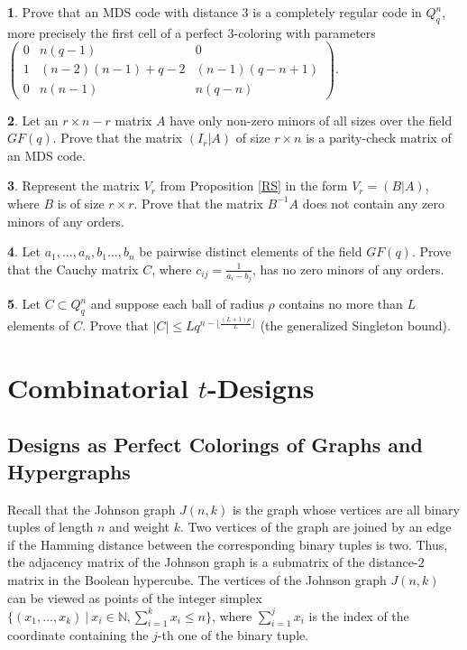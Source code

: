 \documentclass[11pt]{article}
\theoremstyle{definition}
\newtheorem{exercise}{\quad}
\begin{document}
{{{\begin{exercise}
Prove that an MDS code with distance $3$ is a completely
regular code in $Q^n_q$, more precisely the first cell of a perfect
$3$-coloring with parameters $\begin{pmatrix}
0 & n(q-1) & 0 \\
1 & (n-2)(n-1)+q-2 & (n-1)(q-n+1) \\
0 & n(n-1) & n(q-n)
\end{pmatrix}$.
\end{exercise}


\begin{exercise}
Let an $r\times n-r$ matrix $A$ have only non-zero
minors of all sizes over the field $GF(q)$. Prove that the matrix
$(I_r|A)$ of size $r\times n$ is a parity-check matrix of an
MDS code.
\end{exercise}

\begin{exercise}
Represent the matrix $V_r$ from Proposition \ref{RS} in the form $V_r=(B|A)$,
where $B$ is of size $r\times r$. Prove that the matrix $B^{-1}A$ does not
contain any zero minors of any orders.
\end{exercise}

\begin{exercise}
Let $a_1,\dots,a_n,b_1\dots,b_n$ be pairwise distinct elements of the field
$GF(q)$. Prove that the Cauchy matrix $C$, where
$c_{ij}=\frac{1}{a_i-b_j}$, has no zero minors of any
orders.
\end{exercise}

\begin{exercise}
Let $C\subset Q^n_q$ and suppose each ball of radius $\rho$ contains no
more than $L$ elements of $C$. Prove that $|C|\leq Lq^{n-\lfloor
\frac{(L+1)\rho}{L}\rfloor}$ (the generalized Singleton bound).
\end{exercise}








\section{Combinatorial $t$-Designs}

\subsection{Designs as Perfect Colorings of Graphs and Hypergraphs}

Recall that the Johnson graph $J(n,k)$ is the graph whose vertices
are all binary tuples of length $n$ and weight $k$. Two
vertices of the graph are joined by an edge if the Hamming distance between
the corresponding binary tuples is two. Thus, the
adjacency matrix of the Johnson graph is a submatrix of the distance-$2$
matrix in the Boolean hypercube.
The vertices of the Johnson graph $J(n,k)$
can be viewed as points of the integer simplex
$\{(x_1,\dots,x_k) \ |\ x_i\in \mathbb{N},
\sum\limits_{i=1}^kx_i\leq n\}$, where $\sum\limits_{i=1}^jx_i$
is the index of the coordinate containing the $j$-th one of the binary tuple.

}}}
\end{document}
